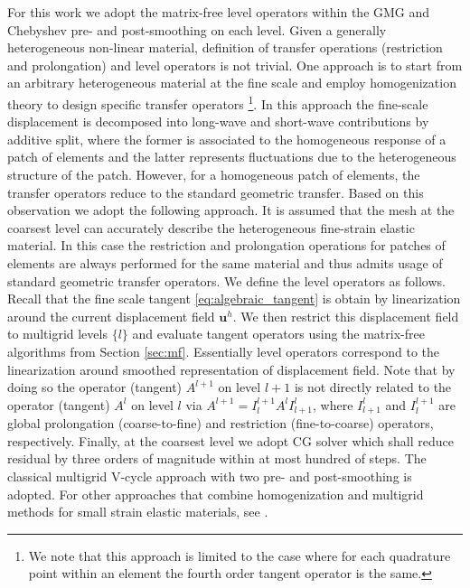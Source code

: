 \documentclass[preprint,12pt,times]{elsarticle}
\def\gz  #1{           \mbox{$\boldsymbol{#1}$}}
\begin{document}
For this work we adopt the matrix-free level operators within the GMG and Chebyshev pre- and post-smoothing on each level. Given a generally heterogeneous non-linear material, definition of transfer operations (restriction and prolongation) and level operators is not trivial. One approach is to start from an arbitrary heterogeneous material at the fine scale and employ homogenization theory \cite{Suquet1985, Hill1972,Hashin1983,Castaneda1997} to design specific transfer operators \cite{Miehe2007}\footnote{
  We note that this approach is limited to the case where for each quadrature point within an element the fourth order tangent operator is the same.
}.
In this approach the fine-scale displacement is decomposed into long-wave and short-wave contributions by additive split, where the former is associated to the homogeneous response of a patch of elements and the latter represents fluctuations due to the heterogeneous structure of the patch. However, for a homogeneous patch of elements, the transfer operators reduce to the standard geometric transfer. Based on this observation we adopt the following approach. It is assumed that the mesh at the coarsest level can accurately describe the heterogeneous fine-strain elastic material. In this case the restriction and prolongation operations for patches of elements are always performed for the same material and thus admits usage of standard geometric transfer operators. We define the level operators as follows. Recall that the fine scale tangent \eqref{eq:algebraic_tangent} is obtain by linearization around the current displacement field $\gz u^h$. We then restrict this displacement field to multigrid levels $\{l\}$ and evaluate tangent operators using the matrix-free algorithms from Section \ref{sec:mf}. Essentially level operators correspond to the linearization around smoothed representation of displacement field.
Note that by doing so the operator (tangent) $A^{l+1}$ on level $l+1$ is not directly related to the operator (tangent) $A^{l}$ on level $l$ via $A^{l+1}=I^{l+1}_{l}  A^l I^l_{l+1}$, where $I^l_{l+1}$ and $I^{l+1}_l$ are global prolongation (coarse-to-fine) and restriction (fine-to-coarse) operators, respectively.
Finally, at the coarsest level we adopt CG solver which shall reduce residual by three orders of magnitude within at most hundred of steps.
The classical multigrid V-cycle approach with two pre- and post-smoothing is adopted. For other approaches that combine homogenization and multigrid methods for small strain elastic materials, see \cite{Bayreuther2003,Fish1995}.
\end{document}

